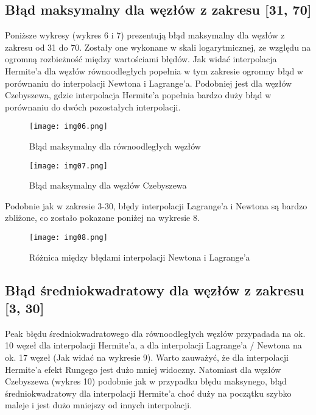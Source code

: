 \documentclass{article}
\begin{document}
\subsection{Błąd maksymalny dla węzłów z zakresu [31, 70]}

Poniższe wykresy (wykres 6 i 7) prezentują błąd maksymalny dla węzłów z zakresu od 31 do 70. Zostały one wykonane w skali logarytmicznej, ze względu na ogromną rozbieżność między wartościami błędów. Jak widać interpolacja Hermite'a dla węzłów równoodległych popełnia w tym zakresie ogromny błąd w porównaniu do interpolacji Newtona i Lagrange'a. Podobniej jest dla węzłów Czebyszewa, gdzie interpolacja Hermite'a popełnia bardzo duży błąd w porównaniu do dwóch pozostałych interpolacji.

\begin{figure}[H]
  \begin{minipage}[b]{0.49\textwidth}
    \texttt{[image: img06.png]}
    \caption{Błąd maksymalny dla równoodległych węzłów}
  \end{minipage}
  \hfill
  \begin{minipage}[b]{0.49\textwidth}
    \texttt{[image: img07.png]}
    \caption{Błąd maksymalny dla węzłów Czebyszewa}
  \end{minipage}
\end{figure}

Podobnie jak w zakresie 3-30, błędy interpolacji Lagrange'a i Newtona są bardzo zbliżone, co zostało pokazane poniżej na wykresie 8.

\begin{figure}[H]
  \centering
  \begin{minipage}[b]{0.93\textwidth}
    \texttt{[image: img08.png]}
    \caption{Różnica między błędami interpolacji Newtona i Lagrange'a}
  \end{minipage}
\end{figure}

\subsection{Błąd średniokwadratowy dla węzłów z zakresu [3, 30]}

Peak błędu średniokwadratowego dla równoodległych węzłów przypadada na ok. 10 węzeł dla interpolacji Hermite'a, a dla interpolacji Lagrange'a / Newtona na ok. 17 węzeł (Jak widać na wykresie 9). Warto zauważyć, że dla interpolacji Hermite'a efekt Rungego jest dużo mniej widoczny. Natomiast dla węzłów Czebyszewa (wykres 10) podobnie jak w przypadku błędu maksynego, błąd średniokwadratowy dla interpolacji Hermite'a choć duży na początku szybko maleje i jest dużo mniejszy od innych interpolacji. 
\end{document}
